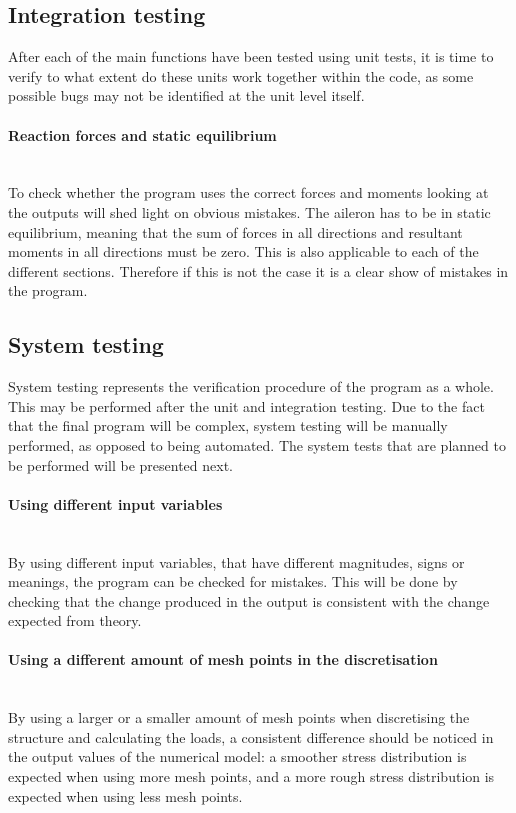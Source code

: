 \subsection{Integration testing}
After each of the main functions have been tested using unit tests, it is time to verify to what extent do these units work together within the code, as some possible bugs may not be identified at the unit level itself.

\paragraph{Reaction forces and static equilibrium}\mbox{}\\
\noindent To check whether the program uses the correct forces and moments looking at the outputs will shed light on obvious mistakes. The aileron has to be in static equilibrium, meaning that the sum of forces in all directions and resultant moments in all directions must be zero. This is also applicable to each of the different sections. Therefore if this is not the case it is a clear show of mistakes in the program.


\subsection{System testing}
System testing represents the verification procedure of the program as a whole. This may be performed after the unit and integration testing. Due to the fact that the final program will be complex, system testing will be manually performed, as opposed to being automated. The system tests that are planned to be performed will be presented next.

\paragraph{Using different input variables}\mbox{}\\
\noindent By using different input variables, that have different magnitudes, signs or meanings, the program can be checked for mistakes. This will be done by checking that the change produced in the output is consistent with the change expected from theory.   

\paragraph{Using a different amount of mesh points in the discretisation}\mbox{}\\
\noindent By using a larger or a smaller amount of mesh points when discretising the structure and calculating the loads, a consistent difference should be noticed in the output values of the numerical model: a smoother stress distribution is expected when using more mesh points, and a more rough stress distribution is expected when using less mesh points.


